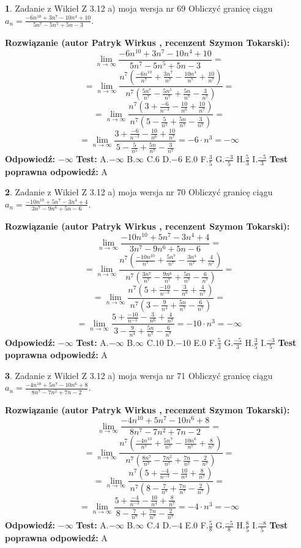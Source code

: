 \documentclass[12pt, a4paper]{article}
\theoremstyle{definition} %
\newtheorem{zad}{}
\newcommand{\zadStart}[1]{\begin{zad}#1\newline}
\newcommand{\zadStop}{\end{zad}}
\newcommand{\rozwStart}[2]{\noindent \textbf{Rozwiązanie (autor #1 , recenzent #2): }\newline}
\newcommand{\rozwStop}{\newline}
\newcommand{\odpStart}{\noindent \textbf{Odpowiedź:}\newline}
\newcommand{\odpStop}{\newline}
\newcommand{\testStart}{\noindent \textbf{Test:}\newline}
\newcommand{\testStop}{\newline}
\newcommand{\kluczStart}{\noindent \textbf{Test poprawna odpowiedź:}\newline}
\newcommand{\kluczStop}{\newline}
\begin{document}
\zadStart{Zadanie z Wikieł Z 3.12 a) moja wersja nr 69}
Obliczyć granicę ciągu $a_{n}=\frac{-6n^{10}+3n^{7}-10n^{4}+10}{5n^{7}-5n^{5}+5n-3}$.
\zadStop
\rozwStart{Patryk Wirkus}{Szymon Tokarski}
$$\lim\limits_{n\to\infty}\frac{-6n^{10}+3n^{7}-10n^{4}+10}{5n^{7}-5n^{5}+5n-3}=$$
$$=\lim\limits_{n\to\infty}\frac{n^{7}\left(\frac{-6n^{10}}{n^{7}}+\frac{3n^{7}}{n^{7}}-\frac{10n^{4}}{n^{7}}+\frac{10}{n^{7}}\right)}{n^{7}\left(\frac{5n^{7}}{n^{7}}-\frac{5n^{5}}{n^{7}}+\frac{5n}{n^{7}}-\frac{3}{n^{7}}\right)}=$$
$$=\lim\limits_{n\to\infty}\frac{n^{7}\left(3+\frac{-6}{n^{-3}}-\frac{10}{n^{6}}+\frac{10}{n^{7}}\right)}
{n^{7}\left(5-\frac{5}{n^{5}}+\frac{5n}{n^{7}}-\frac{3}{n^{7}}\right)}=$$
$$=\lim\limits_{n\to\infty}\frac{3+\frac{-6}{n^{-3}}-\frac{10}{n^{6}}+\frac{10}{n^{7}}}{5-\frac{5}{n^{5}}+\frac{5n}{n^{7}}-\frac{3}{n^{7}}}=-6\cdot n^{3} = -\infty$$
\rozwStop
\odpStart
$-\infty$
\odpStop
\testStart
A.$-\infty$
B.$\infty$
C.$6$
D.$-6$
E.$0$
F.$\frac{3}{5}$
G.$\frac{-3}{5}$
H.$\frac{5}{3}$
I.$\frac{-5}{3}$
\testStop
\kluczStart
A
\kluczStop



\zadStart{Zadanie z Wikieł Z 3.12 a) moja wersja nr 70}
Obliczyć granicę ciągu $a_{n}=\frac{-10n^{10}+5n^{7}-3n^{4}+4}{3n^{7}-9n^{6}+5n-6}$.
\zadStop
\rozwStart{Patryk Wirkus}{Szymon Tokarski}
$$\lim\limits_{n\to\infty}\frac{-10n^{10}+5n^{7}-3n^{4}+4}{3n^{7}-9n^{6}+5n-6}=$$
$$=\lim\limits_{n\to\infty}\frac{n^{7}\left(\frac{-10n^{10}}{n^{7}}+\frac{5n^{7}}{n^{7}}-\frac{3n^{4}}{n^{7}}+\frac{4}{n^{7}}\right)}{n^{7}\left(\frac{3n^{7}}{n^{7}}-\frac{9n^{6}}{n^{7}}+\frac{5n}{n^{7}}-\frac{6}{n^{7}}\right)}=$$
$$=\lim\limits_{n\to\infty}\frac{n^{7}\left(5+\frac{-10}{n^{-3}}-\frac{3}{n^{6}}+\frac{4}{n^{7}}\right)}
{n^{7}\left(3-\frac{9}{n^{4}}+\frac{5n}{n^{7}}-\frac{6}{n^{7}}\right)}=$$
$$=\lim\limits_{n\to\infty}\frac{5+\frac{-10}{n^{-3}}-\frac{3}{n^{6}}+\frac{4}{n^{7}}}{3-\frac{9}{n^{4}}+\frac{5n}{n^{7}}-\frac{6}{n^{7}}}=-10\cdot n^{3} = -\infty$$
\rozwStop
\odpStart
$-\infty$
\odpStop
\testStart
A.$-\infty$
B.$\infty$
C.$10$
D.$-10$
E.$0$
F.$\frac{5}{3}$
G.$\frac{-5}{3}$
H.$\frac{3}{5}$
I.$\frac{-3}{5}$
\testStop
\kluczStart
A
\kluczStop



\zadStart{Zadanie z Wikieł Z 3.12 a) moja wersja nr 71}
Obliczyć granicę ciągu $a_{n}=\frac{-4n^{10}+5n^{7}-10n^{6}+8}{8n^{7}-7n^{2}+7n-2}$.
\zadStop
\rozwStart{Patryk Wirkus}{Szymon Tokarski}
$$\lim\limits_{n\to\infty}\frac{-4n^{10}+5n^{7}-10n^{6}+8}{8n^{7}-7n^{2}+7n-2}=$$
$$=\lim\limits_{n\to\infty}\frac{n^{7}\left(\frac{-4n^{10}}{n^{7}}+\frac{5n^{7}}{n^{7}}-\frac{10n^{6}}{n^{7}}+\frac{8}{n^{7}}\right)}{n^{7}\left(\frac{8n^{7}}{n^{7}}-\frac{7n^{2}}{n^{7}}+\frac{7n}{n^{7}}-\frac{2}{n^{7}}\right)}=$$
$$=\lim\limits_{n\to\infty}\frac{n^{7}\left(5+\frac{-4}{n^{-3}}-\frac{10}{n^{4}}+\frac{8}{n^{7}}\right)}
{n^{7}\left(8-\frac{7}{n^{8}}+\frac{7n}{n^{7}}-\frac{2}{n^{7}}\right)}=$$
$$=\lim\limits_{n\to\infty}\frac{5+\frac{-4}{n^{-3}}-\frac{10}{n^{4}}+\frac{8}{n^{7}}}{8-\frac{7}{n^{8}}+\frac{7n}{n^{7}}-\frac{2}{n^{7}}}=-4\cdot n^{3} = -\infty$$
\rozwStop
\odpStart
$-\infty$
\odpStop
\testStart
A.$-\infty$
B.$\infty$
C.$4$
D.$-4$
E.$0$
F.$\frac{5}{8}$
G.$\frac{-5}{8}$
H.$\frac{8}{5}$
I.$\frac{-8}{5}$
\testStop
\kluczStart
A
\kluczStop
\end{document}
